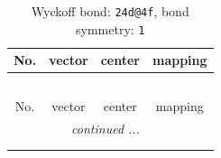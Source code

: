 \documentclass[fleqn,8pt]{jsarticle}
\begin{document}
\renewcommand{\arraystretch}{1.2}
\begin{longtable}{cccc}
\caption{Wyckoff bond: {\tt 24d@4f}, bond symmetry: {\tt 1}}
 \\
 \hline \hline
No. & vector & center & mapping \\ \hline \endfirsthead

\multicolumn{3}{l}{\tablename\ \thetable{}} \\
 \hline \hline
No. & vector & center & mapping \\ \hline \endhead

 \hline \hline
\multicolumn{3}{r}{\footnotesize\it continued ...} \\ \endfoot

 \hline \hline
\multicolumn{3}{r}{} \\ \endlastfoot


\end{longtable}
\end{document}

